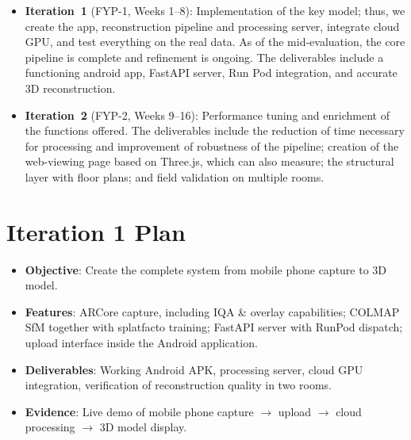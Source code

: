 \begin{itemize}
    \item \textbf{Iteration~1} (FYP-1, Weeks 1--8): Implementation of the key model; thus, we create the app, reconstruction pipeline and processing server, integrate cloud GPU, and test everything on the real data. As of the mid-evaluation, the core pipeline is complete and refinement is ongoing. The deliverables include a functioning android app, FastAPI server, Run Pod integration, and accurate 3D reconstruction.
    \item \textbf{Iteration~2} (FYP-2, Weeks 9--16): Performance tuning and enrichment of the functions offered. The deliverables include the reduction of time necessary for processing and improvement of robustness of the pipeline; creation of the web-viewing page based on Three.js, which can also measure; the structural layer with floor plans; and field validation on multiple rooms.
\end{itemize}

\section{Iteration 1 Plan}
\begin{itemize}
    \item \textbf{Objective}: Create the complete system from mobile phone capture to 3D model.
    \item \textbf{Features}: ARCore capture, including IQA \& overlay capabilities; COLMAP SfM together with splatfacto training; FastAPI server with RunPod dispatch; upload interface inside the Android application.
    \item \textbf{Deliverables}: Working Android APK, processing server, cloud GPU integration, verification of reconstruction quality in two rooms.
    \item \textbf{Evidence}: Live demo of mobile phone capture $\rightarrow$ upload $\rightarrow$ cloud processing $\rightarrow$ 3D model display.
\end{itemize}

